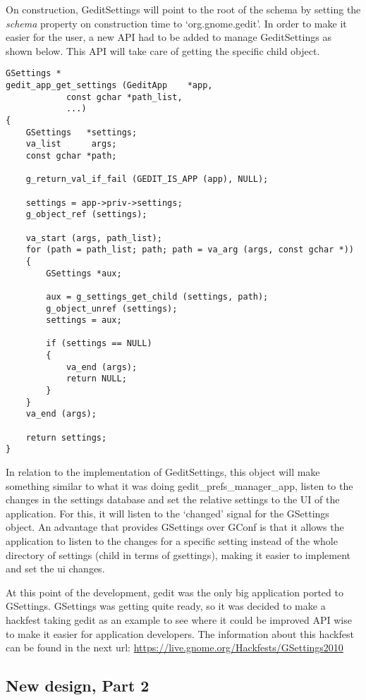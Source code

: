 On construction,  GeditSettings will point to the root of the schema by setting the \emph{schema} property on construction time to `org.gnome.gedit'.
In order to make it easier for the user, a new API had to be added to manage GeditSettings as shown below. This API will take care of getting the specific child object.

\begin{lstlisting}[style=GObject]
GSettings *
gedit_app_get_settings (GeditApp    *app,
			const gchar *path_list,
			...)
{
	GSettings   *settings;
	va_list      args;
	const gchar *path;

	g_return_val_if_fail (GEDIT_IS_APP (app), NULL);

	settings = app->priv->settings;
	g_object_ref (settings);

	va_start (args, path_list);
	for (path = path_list; path; path = va_arg (args, const gchar *))
	{
		GSettings *aux;

		aux = g_settings_get_child (settings, path);
		g_object_unref (settings);
		settings = aux;

		if (settings == NULL)
		{
			va_end (args);
			return NULL;
		}
	}
	va_end (args);

	return settings;
}
\end{lstlisting}

In relation to the implementation of GeditSettings, this object will make something similar to what it was doing gedit\_prefs\_manager\_app, listen to the changes in the settings database and set the relative settings to the UI of the application. For this, it will listen to the `changed' signal for the GSettings object. An advantage that provides GSettings over GConf is that it allows the application to listen to the changes for a specific setting instead of the whole directory of settings (child in terms of gsettings), making it easier to implement and set the ui changes.

At this point of the development, gedit was the only big application ported to GSettings. GSettings was getting quite ready, so it was decided to make a hackfest taking gedit as an example to see where it could be improved API wise to make it easier for application developers. The information about this hackfest can be found in the next url: \url{https://live.gnome.org/Hackfests/GSettings2010}

\newpage
\subsection{New design, Part 2}

